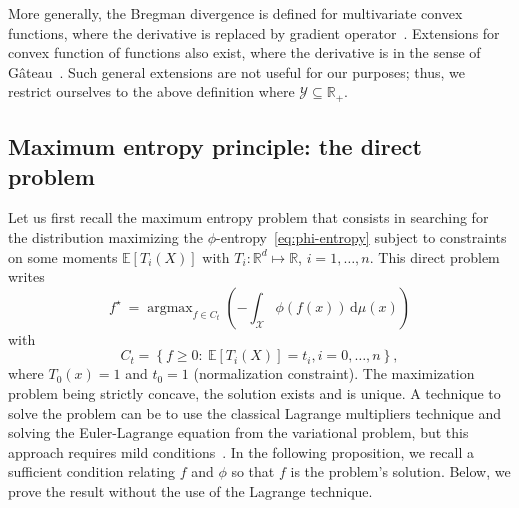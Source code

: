 \documentclass[entropy,article,submit,moreauthors,pdftex]{Definitions/mdpi}
\newcommand{\SZ}[1]{{\color{blue} #1}}                                       %
\def\dmu{\mathrm{d}\mu}%
\def\Rset{\mathbb{R}}%
\def\X{\mathcal{X}}%
\def\Y{\mathcal{Y}}%
\DeclareMathOperator*{\argmax}{\operatorname{argmax}}%
\newcommand{\Esp}[1]{\mathbb{E}\left[ #1 \right]}%
\begin{document}
More  generally,  the Bregman  divergence  is  defined for  multivariate  convex
functions,     where    the     derivative    is     replaced    by     gradient
operator~\cite{Bre67}. Extensions  for convex function of  functions also exist,
where the derivative  is in the sense of  G\^ateau~\cite{NieNoc17}. Such general
extensions are not  useful for our purposes; thus, we  restrict ourselves to the
above definition where $\Y \subseteq \Rset_+$.




\subsection{Maximum entropy principle: the direct problem}
\label{subsec:MaxPhiEntDirect}

Let us first  recall the maximum entropy problem that  consists in searching for
the distribution maximizing the $\phi$-entropy~\eqref{eq:phi-entropy} subject to
constraints on  some moments $\Esp{T_i(X)}$  with $T_i: \Rset^d  \mapsto \Rset$,
$i=1,\ldots,n$. This direct problem writes
%
\begin{equation}\label{eq:MaxEnt}
\displaystyle f^\star \: = \argmax_{f \in C_t} \left( - \int_\X \phi(f(x)) \,
\dmu(x) \right)
\end{equation}
%
with
%
\begin{equation}\label{eq:Ct}
C_t = \left\{ f \ge 0: \: \Esp{T_i(X)} = t_i, i=0,\ldots,n\right\},
\end{equation}
%
where $T_0(x) =  1$ and $t_0 = 1$ (normalization  constraint).  The maximization
problem being strictly  concave, the solution exists and is  unique. A technique
to solve the problem can be  to use the classical Lagrange multipliers technique
\SZ{and solving the  Euler-Lagrange equation from the  variational problem}, but
this  approach requires  mild conditions~\cite{KesKap89,  BorLew91:03, BorLew93,
  BenBor92,  TebVaj93,  Gir97}.  In  the  following  proposition,  we  recall  a
sufficient  condition relating  $f$  and $\phi$  so that  $f$  is the  problem's
solution. Below, we prove the result without the use of the Lagrange technique.
\end{document}
